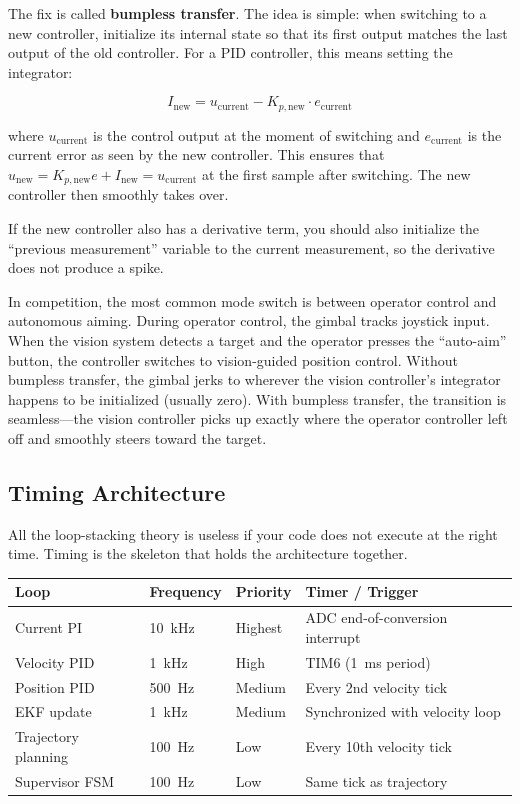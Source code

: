 The fix is called \textbf{bumpless transfer}. The idea is simple: when switching to a new controller, initialize its internal state so that its first output matches the last output of the old controller. For a PID controller, this means setting the integrator:

\begin{equation}
I_{\text{new}} = u_{\text{current}} - K_{p,\text{new}} \cdot e_{\text{current}}
\end{equation}

where $u_{\text{current}}$ is the control output at the moment of switching and $e_{\text{current}}$ is the current error as seen by the new controller. This ensures that $u_{\text{new}} = K_{p,\text{new}} e + I_{\text{new}} = u_{\text{current}}$ at the first sample after switching. The new controller then smoothly takes over.

If the new controller also has a derivative term, you should also initialize the ``previous measurement'' variable to the current measurement, so the derivative does not produce a spike.

In competition, the most common mode switch is between operator control and autonomous aiming. During operator control, the gimbal tracks joystick input. When the vision system detects a target and the operator presses the ``auto-aim'' button, the controller switches to vision-guided position control. Without bumpless transfer, the gimbal jerks to wherever the vision controller's integrator happens to be initialized (usually zero). With bumpless transfer, the transition is seamless---the vision controller picks up exactly where the operator controller left off and smoothly steers toward the target.

\subsection{Timing Architecture}

All the loop-stacking theory is useless if your code does not execute at the right time. Timing is the skeleton that holds the architecture together.

\begin{center}
\begin{tabular}{l l l l}
\hline
\textbf{Loop} & \textbf{Frequency} & \textbf{Priority} & \textbf{Timer / Trigger} \\
\hline
Current PI & 10~kHz & Highest & ADC end-of-conversion interrupt \\
Velocity PID & 1~kHz & High & TIM6 (1~ms period) \\
Position PID & 500~Hz & Medium & Every 2nd velocity tick \\
EKF update & 1~kHz & Medium & Synchronized with velocity loop \\
Trajectory planning & 100~Hz & Low & Every 10th velocity tick \\
Supervisor FSM & 100~Hz & Low & Same tick as trajectory \\
\hline
\end{tabular}
\end{center}

